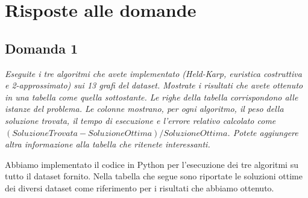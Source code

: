 \section{Risposte alle domande}

\subsection{Domanda 1}

\textit{Eseguite i tre algoritmi che avete implementato (Held-Karp, euristica costruttiva e 2-approssimato) sui 13 grafi
del dataset. Mostrate i risultati che avete ottenuto in una tabella come quella sottostante. Le righe della tabella
corrispondono alle istanze del problema. Le colonne mostrano, per ogni algoritmo, il peso della soluzione trovata, il
tempo di esecuzione e l'errore relativo calcolato come $(SoluzioneTrovata - SoluzioneOttima) / SoluzioneOttima$. Potete
aggiungere altra informazione alla tabella che ritenete interessanti.}

Abbiamo implementato il codice in Python per l'esecuzione dei tre algoritmi su tutto il dataset fornito. Nella tabella che segue sono riportate le soluzioni ottime dei diversi dataset come riferimento per i risultati che abbiamo ottenuto.

